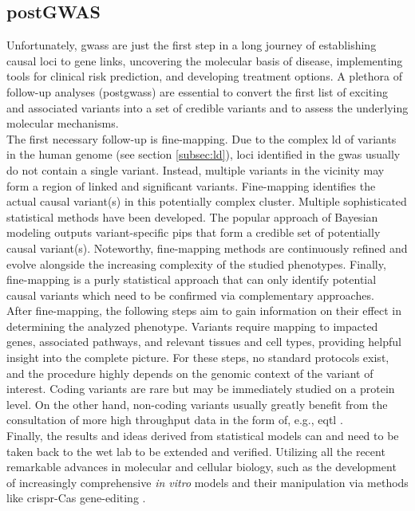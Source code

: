     \subsection{postGWAS}
    \label{subsec:gwas_limit}
    Unfortunately, \acp{gwas} are just the first step in a long journey of establishing causal loci to gene links, uncovering the molecular basis of disease, implementing tools for clinical risk prediction, and developing treatment options. A plethora of follow-up analyses (post\acp{gwas}) are essential to convert the first list of exciting and associated variants into a set of credible variants and to assess the underlying molecular mechanisms.\\
    The first necessary follow-up is fine-mapping. Due to the complex \ac{ld} of variants in the human genome (see section \ref{subsec:ld}), loci identified in the \ac{gwas} usually do not contain a single variant. Instead, multiple variants in the vicinity may form a region of linked and significant variants. Fine-mapping identifies the actual causal variant(s) in this potentially complex cluster. Multiple sophisticated statistical methods have been developed. The popular approach of Bayesian modeling outputs variant-specific \acp{pip} that form a credible set of potentially causal variant(s). Noteworthy, fine-mapping methods are continuously refined and evolve alongside the increasing complexity of the studied phenotypes. Finally, fine-mapping is a purly statistical approach that can only identify potential causal variants which need to be confirmed via complementary approaches. \cite{schaidGenomewideAssociationsCandidate2018, uffelmannGenomewideAssociationStudies2021}\\
    After fine-mapping, the following steps aim to gain information on their effect in determining the analyzed phenotype. Variants require mapping to impacted genes, associated pathways, and relevant tissues and cell types, providing helpful insight into the complete picture. For these steps, no standard protocols exist, and the procedure highly depends on the genomic context of the variant of interest. Coding variants are rare but may be immediately studied on a protein level. On the other hand, non-coding variants usually greatly benefit from the consultation of more high throughput data in the form of, e.g., \ac{eqtl} \cite{uffelmannGenomewideAssociationStudies2021}.\\
    Finally, the results and ideas derived from statistical models can and need to be taken back to the wet lab to be extended and verified. Utilizing all the recent remarkable advances in molecular and cellular biology, such as the development of increasingly comprehensive \textit{in vitro} models and their manipulation via methods like \ac{crispr}-Cas gene-editing \cite{lichouFunctionalStudiesGWAS2020}.


